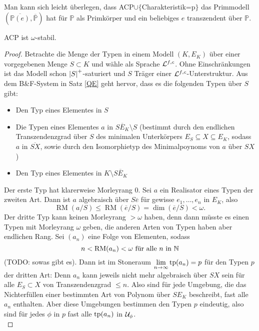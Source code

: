     \begin{remark}
    	Man kann sich leicht überlegen, dass ACP$\cup\{$\glqq{}Charakteristik=p\grqq{}$\}$ das Primmodell $(\overline{\mathbb{P}(e)},\overline{\mathbb{P}})$ hat für $\mathbb{P}$ als Primkörper und ein beliebiges $e$ transzendent über $\mathbb{P}$.
    \end{remark}
    \newpage
    \begin{theorem}
    	ACP ist $\omega$-stabil.
    \end{theorem}
    \begin{proof}
    	Betrachte die Menge der Typen in einem Modell $(K,E_K)$ über einer vorgegebenen Menge $S\subset K$ und wähle als Sprache $\mathcal{L}^{f,c}$. Ohne Einschränkungen ist das Modell schon ${\left| S \right|}^+$-saturiert und $S$ Träger einer $\mathcal{L}^{f,c}$-Unterstruktur. Aus dem B\&F-System in Satz \ref{QE} geht hervor, dass es die folgenden Typen über $S$ gibt:
    	\begin{itemize}
    		\item Den Typ eines Elementes in $S$
    		\item Die Typen eines Elementes $a$ in $\overline{SE_K}\setminus S$ (bestimmt durch den endlichen Trans\-zen\-denz\-grad über $S$ des minimalen Unterkörpers $E_S\subseteq X\subseteq E_K$, sodass $a$ in $\overline{SX}$, sowie durch den Isomorphietyp des Minimalpoynoms von $a$ über $SX$)
    		\item Den Typ eines Elementes in $K\setminus\overline{SE_K}$
    	\end{itemize}
        Der erste Typ hat klarerweise Morleyrang 0. Sei $a$ ein Realisator eines Typen der zweiten Art. Dann ist $a$ algebraisch über $S\overline{e}$ für gewisse $e_1,\dots,e_n$ in $E_K$, also $$\operatorname{RM}(a/S)\leq\operatorname{RM}(\overline{e}/S)=\dim(\overline{e}/S)<\omega.$$
        Der dritte Typ kann keinen Morleyrang $>\omega$ haben, denn dann müsste es einen Typen mit Morleyrang $\omega$ geben, die anderen Arten von Typen haben aber endlichen Rang. Sei $(a_n)$ eine Folge von Elementen, sodass $$n<\operatorname{RM}(a_n)<\omega\text{ für alle }n\text{ in }\mathbb{N}$$ (TODO: sowas gibt es). Dann ist im Stoneraum $\lim\limits_{n\rightarrow\infty}\operatorname{tp}(a_n)=p$ für den Typen $p$ der dritten Art: Denn $a_n$ kann jeweils nicht mehr algebraisch über $SX$ sein für alle $E_S\subset X$ von Transzendenzgrad $\leq n$. Also sind für jede Umgebung, die das Nichterfüllen einer bestimmten Art von Polynom über $SE_K$ beschreibt, fast alle $a_n$ enthalten. Aber diese Umgebungen bestimmen den Typen $p$ eindeutig, also sind für jedes $\phi$ in $p$ fast alle $\operatorname{tp}(a_n)$ in $\mathcal{U}_\phi$.\\

\end{proof}
